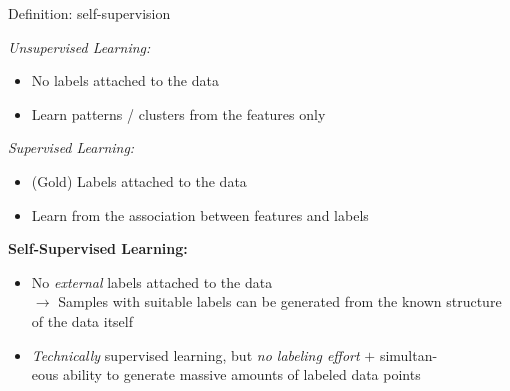 \documentclass[11pt,compress,t,notes=noshow, xcolor=table]{beamer}
\begin{document}
\begin{frame}{Definition: self-supervision}

	\vfill 
	
	\textit{Unsupervised Learning:}

	\begin{itemize}
		\item No labels attached to the data
		\item Learn patterns / clusters from the features only
	\end{itemize}
	
	\textit{Supervised Learning:}

	\begin{itemize}
		\item (Gold) Labels attached to the data
		\item Learn from the association between features and labels
	\end{itemize}
	
	\textbf{Self-Supervised Learning:}

	\begin{itemize}
		\item No \textit{external} labels attached to the data\\
					$\to$ Samples with suitable labels can be generated from the known structure of the data itself 
		\item \textit{Technically} supervised learning, but \textit{no labeling effort} $+$ simultan-\\eous ability to generate massive amounts of labeled data points
	\end{itemize}
	
	\vfill 
	
\end{frame}

\end{document}
